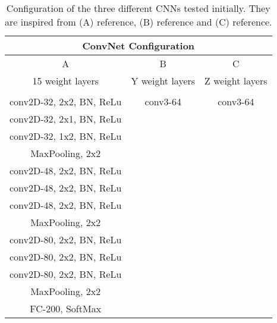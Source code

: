 \medskip
\begin{table}[htbp]
\begin{center}
\begin{tabular}{|c|c|c|}

  \hline
  \multicolumn{3}{|c|}{ConvNet Configuration} \\
  \hline

  A & B & C
  \\\hline

  15 weight layers & Y weight layers & Z weight layers
  \\\hhline{|=|=|=|}

  \multicolumn{3}{|c|}{input ($64\times64\times3\;RGB\;image$)}
  \\\hline

  conv2D-32, 2x2, BN, ReLu & conv3-64 & conv3-64 \\
  conv2D-32, 2x1, BN, ReLu \\
  conv2D-32, 1x2, BN, ReLu  \\ \hline
  MaxPooling, 2x2
  \\\hline
  conv2D-48, 2x2, BN, ReLu \\
  conv2D-48, 2x2, BN, ReLu \\
  conv2D-48, 2x2, BN, ReLu\\ \hline
  MaxPooling, 2x2
  \\\hline
  conv2D-80, 2x2, BN, ReLu \\
  conv2D-80, 2x2, BN, ReLu \\
  conv2D-80, 2x2, BN, ReLu\\ \hline
  MaxPooling, 2x2
  \\\hline
  FC-200, SoftMax \\
  \hline
  \end{tabular}
\caption[]
{\small
  Configuration of the three different CNNs tested initially. They are inspired from (A) reference, (B) reference and (C) reference.
}
\label{table:3_configurations}
\end{center}
\end{table}
